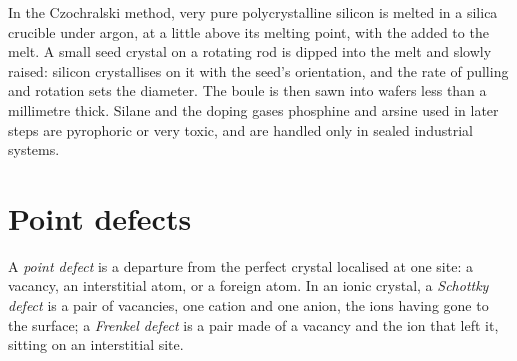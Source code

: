 \begin{inthelab}
In the Czochralski method, very pure polycrystalline silicon is melted in a
silica crucible under argon, at a little above its melting point, with the
 added to the melt. A small seed crystal on a rotating rod is dipped into
the melt and slowly raised: silicon crystallises on it with the seed's
orientation, and the rate of pulling and rotation sets the diameter. The boule
is then sawn into wafers less than a millimetre thick. Silane and the doping
gases phosphine and arsine used in later steps are pyrophoric or very toxic,
and are handled only in sealed industrial systems.
\end{inthelab}

\section{Point defects}

\begin{definition}\label{def:b3:solid-state:defects}
A \emph{point defect} is a departure from the perfect
crystal localised at one site: a vacancy, an interstitial atom, or a foreign
atom. In an ionic crystal, a \emph{Schottky defect} is a
pair of vacancies, one cation and one anion, the ions having gone to the
surface; a \emph{Frenkel defect} is a pair made of a
vacancy and the ion that left it, sitting on an interstitial site.
\end{definition}

